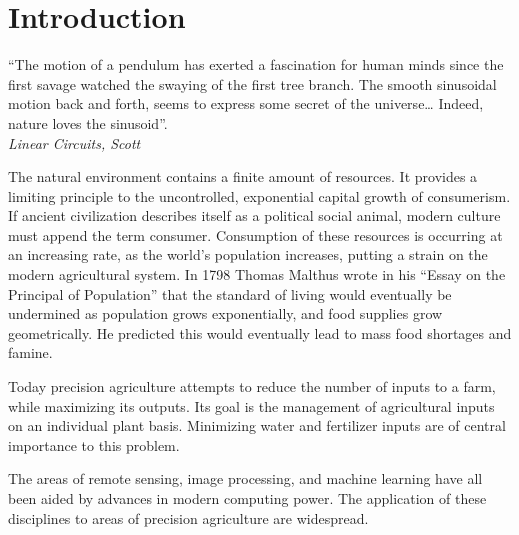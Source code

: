 \chapter{Introduction}

\begin{center}
  \begin{minipage}{0.75\textwidth}
    \begin{small}
      “The motion of a pendulum has exerted a fascination for human minds since the first savage watched the swaying of the first tree branch. The smooth sinusoidal motion back and forth, seems to express some secret of the universe…
      Indeed, nature loves the sinusoid”.\\
      \null\hfill\emph{Linear Circuits, Scott}
    \end{small}
  \end{minipage}
  \vspace{0.5cm}
\end{center}

\noindent The natural environment contains a finite amount of resources.  It provides a limiting principle to the uncontrolled, exponential capital growth of consumerism.  If ancient civilization describes itself as a political social animal, modern culture must append the term consumer. Consumption of these resources is occurring at an increasing rate, as the world’s population increases, putting a strain on the modern agricultural system.  In 1798 Thomas Malthus wrote in his “Essay on the Principal of Population” that the standard of living would eventually be undermined as population grows exponentially, and food supplies grow geometrically.  He predicted this would eventually lead to mass food shortages and famine.

Today precision agriculture attempts to reduce the number of inputs to a farm, while maximizing its outputs.  Its goal is the management of agricultural inputs on an individual plant basis.  Minimizing water and fertilizer inputs are of central importance to this problem.

The areas of remote sensing, image processing, and machine learning have all been aided by advances in modern computing power.  The application of these disciplines to areas of precision agriculture are widespread.

